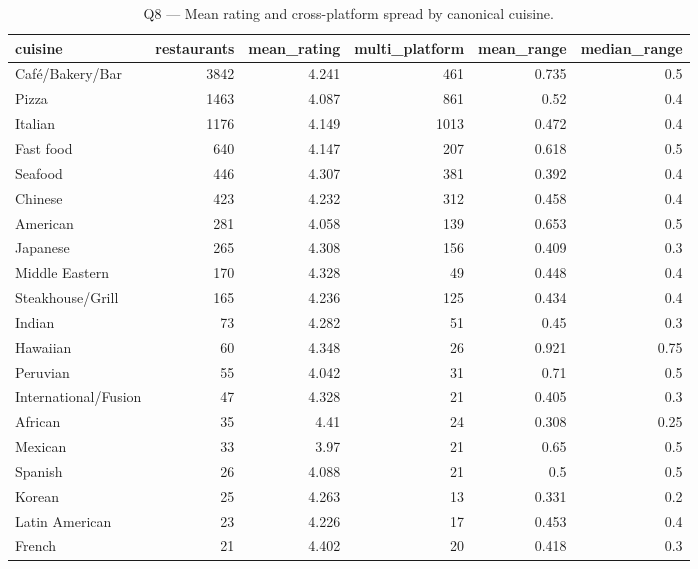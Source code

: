 \begin{table}[ht]
\centering
\caption{Q8 — Mean rating and cross-platform spread by canonical cuisine.}
\label{tab:q8_cuisine_consistency}
{\tiny
\begin{tabular}{lrrrrr}
\toprule
cuisine & restaurants & mean\_rating & multi\_platform & mean\_range & median\_range \\
\midrule
Café/Bakery/Bar & 3842 & 4.241 & 461 & 0.735 & 0.5 \\
Pizza & 1463 & 4.087 & 861 & 0.52 & 0.4 \\
Italian & 1176 & 4.149 & 1013 & 0.472 & 0.4 \\
Fast food & 640 & 4.147 & 207 & 0.618 & 0.5 \\
Seafood & 446 & 4.307 & 381 & 0.392 & 0.4 \\
Chinese & 423 & 4.232 & 312 & 0.458 & 0.4 \\
American & 281 & 4.058 & 139 & 0.653 & 0.5 \\
Japanese & 265 & 4.308 & 156 & 0.409 & 0.3 \\
Middle Eastern & 170 & 4.328 & 49 & 0.448 & 0.4 \\
Steakhouse/Grill & 165 & 4.236 & 125 & 0.434 & 0.4 \\
Indian & 73 & 4.282 & 51 & 0.45 & 0.3 \\
Hawaiian & 60 & 4.348 & 26 & 0.921 & 0.75 \\
Peruvian & 55 & 4.042 & 31 & 0.71 & 0.5 \\
International/Fusion & 47 & 4.328 & 21 & 0.405 & 0.3 \\
African & 35 & 4.41 & 24 & 0.308 & 0.25 \\
Mexican & 33 & 3.97 & 21 & 0.65 & 0.5 \\
Spanish & 26 & 4.088 & 21 & 0.5 & 0.5 \\
Korean & 25 & 4.263 & 13 & 0.331 & 0.2 \\
Latin American & 23 & 4.226 & 17 & 0.453 & 0.4 \\
French & 21 & 4.402 & 20 & 0.418 & 0.3 \\
\bottomrule
\end{tabular}
}
\end{table}
